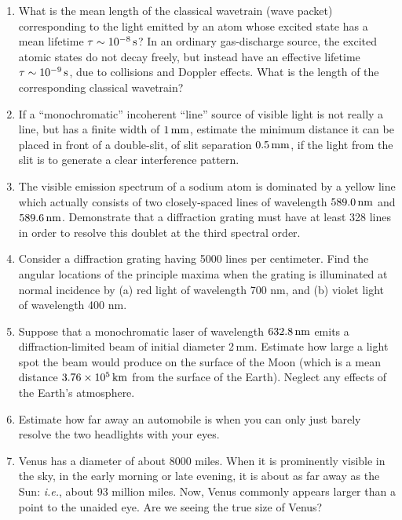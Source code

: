 {\begin{enumerate}
\item What is the mean length of the classical wavetrain (wave packet) corresponding to the light emitted by an
atom whose excited state has a mean lifetime $\tau\sim 10^{-8}\,{\rm s}$? In an ordinary gas-discharge source, the
excited atomic states do not decay freely, but instead have an effective lifetime $\tau\sim 10^{-9}\,{\rm s}$, due to
collisions and Doppler effects. What is the length of the corresponding classical wavetrain?

\item If a ``monochromatic''  incoherent ``line'' source of visible light is not really a line, but has a finite width of $1\,{\rm mm}$, estimate  the
minimum distance it can
 be placed in front of a double-slit, of slit separation $0.5\,{\rm mm}$, if the light from the slit is to generate a
 clear interference pattern.
 
 \item The visible emission spectrum of a sodium atom  is dominated by a yellow line which actually consists of two
 closely-spaced lines of wavelength $589.0\,{\rm nm}$ and $589.6\,{\rm nm}$. Demonstrate that a diffraction
 grating must have at least 328 lines in order to resolve this doublet at the third spectral order. 
  
  \item Consider a diffraction grating having 5000 lines per centimeter. Find the angular
  locations of the principle maxima when the grating is illuminated at normal incidence by (a) red light of
  wavelength 700 nm, and (b) violet light of wavelength 400 nm.
  
  \item Suppose that a monochromatic laser of wavelength $632.8\,{\rm nm}$ emits a
  diffrac\-tion-limited beam of initial diameter 2\,mm. Estimate how large a light spot
  the beam would produce on the surface of the Moon (which is a mean distance
  $3.76\times 10^5\,{\rm km}$ from the surface of the Earth). Neglect any effects of the Earth's atmosphere.
  
 \item Estimate how far away an automobile is when you can only just barely resolve the two headlights with your eyes. 
 
 \item Venus has a diameter of about 8000 miles. When it is prominently visible in the sky, in the early morning or late evening, it
 is about as far away as the Sun: {\em i.e.}, about 93 million miles. Now, Venus commonly appears larger than a point to the
 unaided eye. Are we seeing the true size of Venus?
 

\end{enumerate}}
